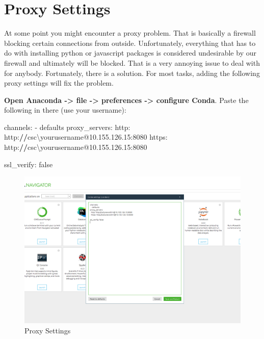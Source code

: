 \documentclass[
]{book}
\newenvironment{Shaded}{\begin{snugshade}}{\end{snugshade}}
\newcommand{\DecValTok}[1]{\textcolor[rgb]{0.00,0.00,0.81}{#1}}
\newcommand{\ErrorTok}[1]{\textcolor[rgb]{0.64,0.00,0.00}{\textbf{#1}}}
\newcommand{\FloatTok}[1]{\textcolor[rgb]{0.00,0.00,0.81}{#1}}
\newcommand{\NormalTok}[1]{#1}
\newcommand{\SpecialCharTok}[1]{\textcolor[rgb]{0.00,0.00,0.00}{#1}}
\begin{document}
\hypertarget{proxy-settings}{%
\section{Proxy Settings}\label{proxy-settings}}

At some point you might encounter a proxy problem. That is basically a firewall blocking certain connections from outside. Unfortunately, everything that has to do with installing python or javascript packages is considered undesirable by our firewall and ultimately will be blocked. That is a very annoying issue to deal with for anybody. Fortunately, there is a solution. For most tasks, adding the following proxy settings will fix the problem.

\textbf{Open Anaconda -\textgreater{} file -\textgreater{} preferences -\textgreater{} configure Conda}. Paste the following in there (use your username):

\begin{Shaded}
\begin{Highlighting}[]
\NormalTok{channels}\SpecialCharTok{:}
  \SpecialCharTok{{-}}\NormalTok{ defaults}
\NormalTok{proxy\_servers}\SpecialCharTok{:}
\NormalTok{  http}\SpecialCharTok{:}\NormalTok{ http}\SpecialCharTok{:}\ErrorTok{//}\NormalTok{csc\textbackslash{}yourusername}\SpecialCharTok{@}\DecValTok{10}\NormalTok{.}\DecValTok{155}\NormalTok{.}\FloatTok{126.15}\SpecialCharTok{:}\DecValTok{8080}
\NormalTok{  https}\SpecialCharTok{:}\NormalTok{ http}\SpecialCharTok{:}\ErrorTok{//}\NormalTok{csc\textbackslash{}yourusername}\SpecialCharTok{@}\DecValTok{10}\NormalTok{.}\DecValTok{155}\NormalTok{.}\FloatTok{126.15}\SpecialCharTok{:}\DecValTok{8080}

\NormalTok{ssl\_verify}\SpecialCharTok{:}\NormalTok{ false}
\end{Highlighting}
\end{Shaded}

\begin{figure}
\centering
\includegraphics{my_files/proxy.png}
\caption{Proxy Settings}
\end{figure}
\end{document}

